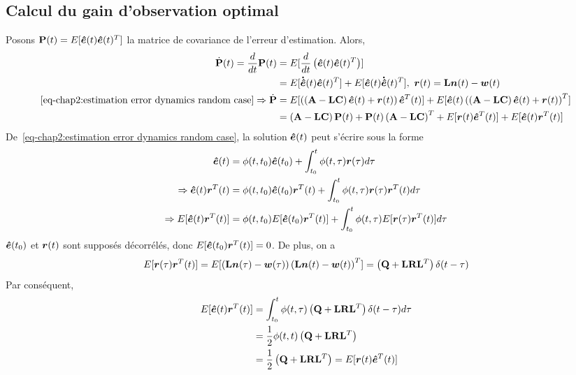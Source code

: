 \subsection{Calcul du gain d'observation optimal}
Posons $\mathbf{P}(t)=E[\bm{\hat{e}}(t)\bm{\hat{e}}(t)^T]$ la matrice de covariance de l'erreur d'estimation. Alors,
\begin{align}\label{eq-chap2:covariance matrix derivative}
	\begin{split}
		\dot{\mathbf{P}}(t)=\frac{d}{dt}\mathbf{P}(t)&=E[\frac{d}{dt}\left(\bm{\hat{e}}(t)\bm{\hat{e}}(t)^T\right)] \\	
		&=E[\bm{\dot{\hat{e}}}(t)\bm{\hat{e}}(t)^T] + E[\bm{\hat{e}}(t)\bm{\dot{\hat{e}}}(t)^T], \ \bm{r}(t) =\mathbf{L}\bm{n}(t)-\bm{w} 	(t) \\
		\eqref{eq-chap2:estimation error dynamics random case} \Rightarrow 	\dot{\mathbf{P}} &= E[\left(\left(\mathbf{A}-\mathbf{L}\mathbf{C}\right)\bm{\hat{e}}(t) + \bm{r}(t)\right)\bm{\hat{e}}^T(t)]+E[\bm{\hat{e}}(t)\left(\left(\mathbf{A}-\mathbf{L}\mathbf{C}\right)\bm{\hat{e}}(t) + \bm{r}(t)\right)^T]\\
		&=\left(\mathbf{A}-\mathbf{L}\mathbf{C}\right)\mathbf{P}(t) + \mathbf{P}(t)\left(\mathbf{A}-\mathbf{L}\mathbf{C}\right)^T+ E[\bm{r}(t)\bm{\hat{e}}^T(t)] + E[\bm{\hat{e}}(t)\bm{r}^T(t)]
	\end{split}	
\end{align}
De~\eqref{eq-chap2:estimation error dynamics random case}, la solution $\bm{\hat{e}}(t)$ peut s'écrire sous la forme 
\begin{align}
	\begin{split}
		\bm{\hat{e}}(t) &= \phi(t,t_0)\bm{\hat{e}}(t_0)+\int_{t_0}^{t}\phi(t,\tau)\bm{r}(\tau)d\tau \\
		\Rightarrow \bm{\hat{e}}(t)\bm{r}^T(t) &= \phi(t,t_0)\bm{\hat{e}}(t_0)\bm{r}^T(t)+\int_{t_0}^{t}\phi(t,\tau)\bm{r}(\tau)\bm{r}^T(t)d\tau\\
		\Rightarrow E[\bm{\hat{e}}(t)\bm{r}^T(t)] &=\phi(t,t_0)E[\bm{\hat{e}}(t_0)\bm{r}^T(t)] + \int_{t_0}^{t}\phi(t,\tau)E[\bm{r}(\tau)\bm{r}^T(t)]d\tau
	\end{split}
\end{align}
$\bm{\hat{e}}(t_0)$ et $\bm{r}(t)$ sont supposés décorrélés, donc $E[\bm{\hat{e}}(t_0)\bm{r}^T(t)]=0$. De plus, on a
\begin{equation}
	E[\bm{r}(\tau)\bm{r}^T(t)] = E[\left(\mathbf{L}\bm{n}(\tau)-\bm{w} 	(\tau)\right)\left(\mathbf{L}\bm{n}(t)-\bm{w} 	(t)\right)^T] = \left(\mathbf{Q}+\mathbf{L}\mathbf{R}\mathbf{L}^T\right)\delta(t-\tau)
\end{equation}
Par conséquent,
\begin{align}\label{eq-chap2:estError res covar}
	\begin{split}
	 E[\bm{\hat{e}}(t)\bm{r}^T(t)] &= \int_{t_0}^{t}\phi(t,\tau)\left(\mathbf{Q}+\mathbf{L}\mathbf{R}\mathbf{L}^T\right)\delta(t-\tau)d\tau \\ 
	 &=\frac{1}{2}\phi(t,t)\left(\mathbf{Q}+\mathbf{L}\mathbf{R}\mathbf{L}^T\right)\\
	 &=\frac{1}{2}\left(\mathbf{Q}+\mathbf{L}\mathbf{R}\mathbf{L}^T\right) = E[\bm{r}(t)\bm{\hat{e}}^T(t)]
	\end{split}
\end{align}
